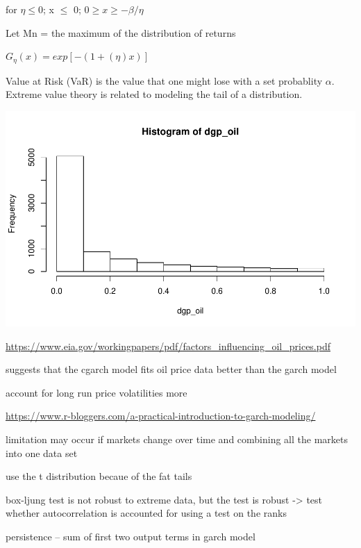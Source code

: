 \documentclass[11pt]{article}\usepackage[]{graphicx}\usepackage[]{color}
\makeatletter
\def\maxwidth{ %
  \ifdim\Gin@nat@width>\linewidth
    \linewidth
  \else
    \Gin@nat@width
  \fi
}
\newenvironment{knitrout}{}{} %
\makeatother
\begin{document}
for $\eta \leq 0$; x $\leq$ 0; $0 \geq x \geq -\beta/\eta$


Let Mn = the maximum of the distribution of returns

$G_{\eta}(x) = exp[-(1+(\eta)x)]$

Value at Risk (VaR) is the value that one might lose with a set probablity $\alpha$. Extreme value theory is related to modeling the tail of a distribution. 

\begin{knitrout}\footnotesize
{}\color{fgcolor}

{\centering \includegraphics[width=\maxwidth]{figure/var-1} 

}



\end{knitrout}

\url{https://www.eia.gov/workingpapers/pdf/factors_influencing_oil_prices.pdf}

suggests that the cgarch model fits oil price data better than the garch model

account for long run price volatilities more

\url{https://www.r-bloggers.com/a-practical-introduction-to-garch-modeling/}

limitation may occur if markets change over time and combining all the markets into one data set

use the t distribution becaue of the fat tails

box-ljung test is not robust to extreme data, but the test is robust -> test whether autocorrelation is accounted for using a test on the ranks

persistence -- sum of first two output terms in garch model
\end{document}
